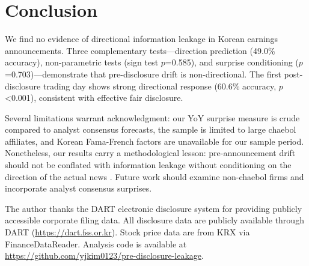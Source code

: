 \documentclass[manuscript,review,anonymous]{acmart}
\begin{document}
\section{Conclusion}

We find no evidence of directional information leakage in Korean earnings announcements. Three complementary tests---direction prediction (49.0\% accuracy), non-parametric tests (sign test $p$=0.585), and surprise conditioning ($p$=0.703)---demonstrate that pre-disclosure drift is non-directional. The first post-disclosure trading day shows strong directional response (60.6\% accuracy, $p$<0.001), consistent with effective fair disclosure.

Several limitations warrant acknowledgment: our YoY surprise measure is crude compared to analyst consensus forecasts, the sample is limited to large chaebol affiliates, and Korean Fama-French factors are unavailable for our sample period. Nonetheless, our results carry a methodological lesson: pre-announcement drift should not be conflated with information leakage without conditioning on the direction of the actual news \cite{meulbroek1992comparison, bernile2016can, atiase1985predisclosure}. Future work should examine non-chaebol firms and incorporate analyst consensus surprises.

\begin{acks}
The author thanks the DART electronic disclosure system for providing publicly accessible corporate filing data. All disclosure data are publicly available through DART (\url{https://dart.fss.or.kr}). Stock price data are from KRX via FinanceDataReader. Analysis code is available at \url{https://github.com/yjkim0123/pre-disclosure-leakage}.
\end{acks}



\end{document}
